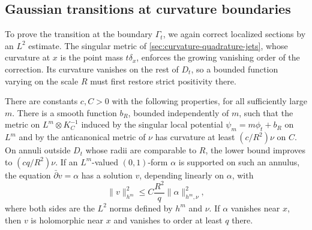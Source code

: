 \subsection{Gaussian transitions at curvature boundaries}
\label{sec:mesoscopic-growing-jets}

To prove the transition at the boundary $\Gamma_t$, we again correct localized sections by an $L^2$ estimate. The singular metric of \cref{sec:curvature-quadrature-jets}, whose curvature at $x$ is the point mass $t\delta_x$, enforces the growing vanishing order of the correction. Its curvature vanishes on the rest of $D_t$, so a bounded function varying on the scale $R$ must first restore strict positivity there.

\begin{lemma}\label{lem:shrinking-order-correction}
There are constants $c,C>0$ with the following properties, for all sufficiently large $m$. There is a smooth function $b_R$, bounded independently of $m$, such that the metric on $L^m\otimes K_C^{-1}$ induced by the singular local potential $\psi_m=m\phi_t+b_R$ on $L^m$ and by the anticanonical metric of $\nu$ has curvature at least $(c/R^2)\nu$ on $C$. On annuli outside $D_t$ whose radii are comparable to $R$, the lower bound improves to $(cq/R^2)\nu$. If an $L^m$-valued $(0,1)$-form $\alpha$ is supported on such an annulus, the equation $\bar\partial v=\alpha$ has a solution $v$, depending linearly on $\alpha$, with
\begin{equation}\label{eq:order-preserving-correction}
 \|v\|_{h^m}^2\leq C\frac{R^2}{q}\|\alpha\|_{h^m,\nu}^2,
\end{equation}
where both sides are the $L^2$ norms defined by $h^m$ and $\nu$. If $\alpha$ vanishes near $x$, then $v$ is holomorphic near $x$ and vanishes to order at least $q$ there.
\end{lemma}
